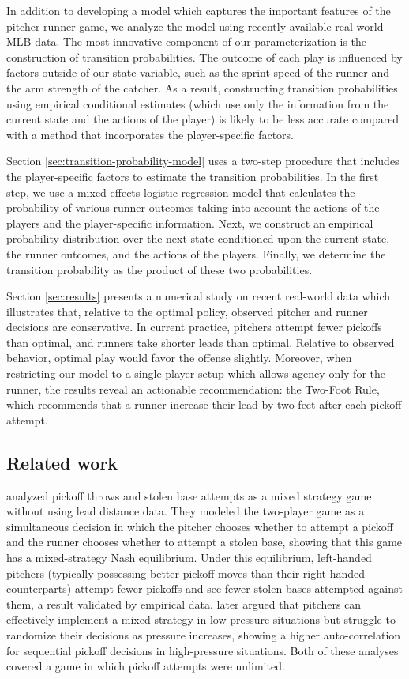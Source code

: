 \documentclass[opre,dblanonrev]{informs4}
\begin{document}
    In addition to developing a model which captures the important features of the pitcher-runner game, we analyze the model using recently available real-world MLB data. The most innovative component of our parameterization is the construction of transition probabilities. The outcome of each play is influenced by factors outside of our state variable, such as the sprint speed of the runner and the arm strength of the catcher. As a result, constructing transition probabilities using empirical conditional estimates (which use only the information from the current state and the actions of the player) is likely to be less accurate compared with a method that incorporates the player-specific factors.
    
    Section \ref{sec:transition-probability-model} uses a two-step procedure that includes the player-specific factors to estimate the transition probabilities. In the first step, we use a mixed-effects logistic regression model that calculates the probability of various runner outcomes taking into account the actions of the players and the player-specific information. Next, we construct an empirical probability distribution over the next state conditioned upon the current state, the runner outcomes, and the actions of the players. Finally, we determine the transition probability as the product of these two probabilities.

    Section \ref{sec:results} presents a numerical study on recent real-world data which illustrates that, relative to the optimal policy, observed pitcher and runner decisions are conservative. In current practice, pitchers attempt fewer pickoffs than optimal, and runners take shorter leads than optimal. Relative to observed behavior, optimal play would favor the offense slightly. Moreover, when restricting our model to a single-player setup which allows agency only for the runner, the results reveal an actionable recommendation: the Two-Foot Rule, which recommends that a runner increase their lead by two feet after each pickoff attempt.

    \subsection{Related work}

    \citet{downey_pick_2015} analyzed pickoff throws and stolen base attempts as a mixed strategy game without using lead distance data. They modeled the two-player game as a simultaneous decision in which the pitcher chooses whether to attempt a pickoff and the runner chooses whether to attempt a stolen base, showing that this game has a mixed-strategy Nash equilibrium. Under this equilibrium, left-handed pitchers (typically possessing better pickoff moves than their right-handed counterparts) attempt fewer pickoffs and see fewer stolen bases attempted against them, a result validated by empirical data. \citet{downey_pressure_2019} later argued that pitchers can effectively implement a mixed strategy in low-pressure situations but struggle to randomize their decisions as pressure increases, showing a higher auto-correlation for sequential pickoff decisions in high-pressure situations. Both of these analyses covered a game in which pickoff attempts were unlimited.
\end{document}

